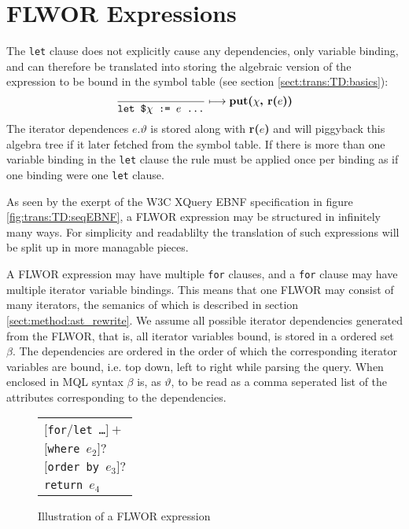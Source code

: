 \section{FLWOR Expressions}
\label{sect:trans:TD:simpleFLWOR}
The \texttt{let} clause does not explicitly cause any dependencies, only variable binding, and can therefore be
translated into storing the algebraic version of the expression to be bound in
the symbol table (see section \ref{sect:trans:TD:basics}):
\begin{equation}
\frac{}{\mbox{\texttt{let \$}}\chi \mbox{\texttt{ := }}e \mbox{\texttt{ \ldots}}}\longmapsto
\mbox{\textbf{put(}}\chi\mbox{\textbf{, r(}}e\mbox{\textbf{))}}
\label{rule:trans:TD:letbind}
\end{equation}
The iterator dependences $e.\vartheta$ is stored along with \textbf{r(}$e$\textbf{)} and will piggyback this
algebra tree if it later fetched from the symbol table. If there is more than one variable binding in the
\texttt{let} clause the rule must be applied once per binding as if one binding were one \texttt{let} clause.

As seen by the exerpt of the W3C XQuery EBNF specification in figure \ref{fig:trans:TD:seqEBNF}, a FLWOR
expression may be structured in infinitely many ways. For simplicity and readablilty the translation of such
expressions will be split up in more managable pieces. 

A FLWOR expression may have multiple \texttt{for} clauses, and a \texttt{for} clause may have multiple iterator
variable bindings. This means that one FLWOR may consist of many iterators, the semanics of which is described in
section \ref{sect:method:ast_rewrite}. We assume all possible iterator dependencies generated from the FLWOR, that
is, all iterator variables bound, is stored in a ordered set $\beta$. The dependencies are ordered in the order of
which the corresponding iterator variables are bound, i.e. top down, left to right while parsing the query. When
enclosed in MQL syntax $\beta$ is, as $\vartheta$, to be read as a comma seperated list of the attributes
corresponding to the dependencies.

\begin{figure}[h]
\centering
\begin{tabular}{l}
$[$\texttt{for}/\texttt{let \ldots}$]+$ \\ \quad
$[$\texttt{where }$e_2]?$ \\ \quad
$[$\texttt{order by }$e_3]?$ \\
\texttt{return }$e_4$
\end{tabular}
\label{fig:trans:TD:flworIll}
\caption{Illustration of a FLWOR expression}
\end{figure}

